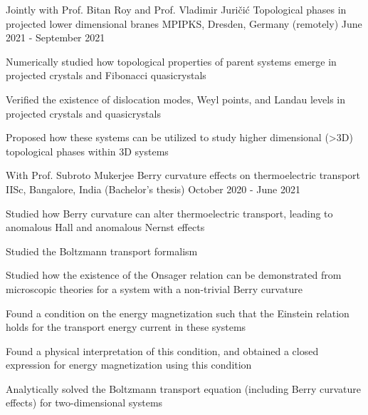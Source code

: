 

\begin{cventries}

\cventry
{Jointly with Prof. Bitan Roy and Prof. Vladimir Juri\v{c}i\'c} %
{Topological phases in projected lower dimensional branes} %
{MPIPKS, Dresden, Germany (remotely)} %
{June 2021 - September 2021} %
{
	\begin{cvitems} %
		\item {Numerically studied how topological properties of parent systems emerge in projected crystals and Fibonacci quasicrystals}
		\item {Verified the existence of dislocation modes, Weyl points, and Landau levels in projected crystals and quasicrystals}
		\item {Proposed how these systems can be utilized to study higher dimensional (>3D) topological phases within 3D systems}
	\end{cvitems}
}

\cventry
{With Prof. Subroto Mukerjee} %
{Berry curvature effects on thermoelectric transport} %
{IISc, Bangalore, India \space \space\space\space\space\space\space\space\space\space\space(Bachelor's thesis)} %
{October 2020 - June 2021} %
{
	\begin{cvitems} %
		\item {Studied how Berry curvature can alter thermoelectric transport, leading to anomalous Hall and anomalous Nernst effects}
		\item {Studied the Boltzmann transport formalism}
		\item {Studied how the existence of the Onsager relation can be demonstrated from microscopic theories for a system with a non-trivial Berry curvature}
		\item {Found a condition on the energy magnetization such that the Einstein relation holds for the transport energy current in these systems}
		\item {Found a physical interpretation of this condition, and obtained a closed expression for energy magnetization using this condition}
		\item {Analytically solved the Boltzmann transport equation (including Berry curvature effects) for two-dimensional systems}
	\end{cvitems}
}
	

\end{cventries}
